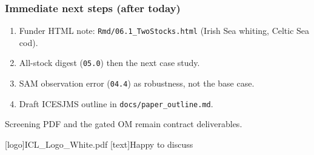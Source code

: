 \documentclass[
  aspectratio=169,
  t,
  onlytextwidth,
  10pt,
]{beamer}
\begin{document}
\begin{frame}
  \frametitle{Immediate next steps (after today)}

  \begin{enumerate}
    \item Funder HTML note: \texttt{Rmd/06.1\_TwoStocks.html}
          (Irish Sea whiting, Celtic Sea cod).
    \item All-stock digest (\texttt{05.0}) then the next case study.
    \item SAM observation error (\texttt{04.4}) as robustness, not the base case.
    \item Draft ICESJMS outline in \texttt{docs/paper\_outline.md}.
  \end{enumerate}

  \vspace{0.5em}
  Screening PDF and the gated OM remain contract deliverables.
\end{frame}

\begingroup
  [logo]{ICL_Logo_White.pdf}
  [text]{Happy to discuss}
\endgroup
\end{document}
